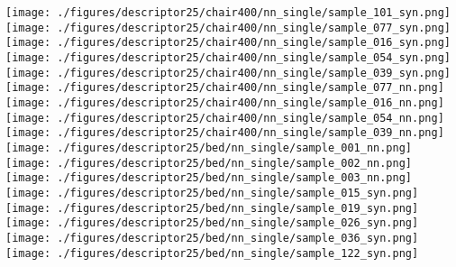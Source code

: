 \documentclass[10pt,twocolumn,letterpaper]{article}
\begin{document}
\begin{figure*}[h]
    \texttt{[image: ./figures/descriptor25/chair400/nn\_single/sample\_101\_syn.png]} \hspace{-3mm}	
    \texttt{[image: ./figures/descriptor25/chair400/nn\_single/sample\_077\_syn.png]} \hspace{-3mm}	
    \texttt{[image: ./figures/descriptor25/chair400/nn\_single/sample\_016\_syn.png]} \hspace{-3mm}	
    \texttt{[image: ./figures/descriptor25/chair400/nn\_single/sample\_054\_syn.png]} \hspace{-2mm}	
     \texttt{[image: ./figures/descriptor25/chair400/nn\_single/sample\_039\_syn.png]}  \hspace{-2mm}   
     \texttt{[image: ./figures/descriptor25/chair400/nn\_single/sample\_077\_nn.png]} \hspace{-3mm}
     \texttt{[image: ./figures/descriptor25/chair400/nn\_single/sample\_016\_nn.png]}
      \hspace{-3mm}
     \texttt{[image: ./figures/descriptor25/chair400/nn\_single/sample\_054\_nn.png]} \hspace{-3mm}
     \texttt{[image: ./figures/descriptor25/chair400/nn\_single/sample\_039\_nn.png]}     
      \\ 
	\texttt{[image: ./figures/descriptor25/bed/nn\_single/sample\_001\_nn.png]} \hspace{-1mm}
	\texttt{[image: ./figures/descriptor25/bed/nn\_single/sample\_002\_nn.png]} \hspace{-1mm}
	\texttt{[image: ./figures/descriptor25/bed/nn\_single/sample\_003\_nn.png]}  
	\texttt{[image: ./figures/descriptor25/bed/nn\_single/sample\_015\_syn.png]}  \hspace{-1mm}
	\texttt{[image: ./figures/descriptor25/bed/nn\_single/sample\_019\_syn.png]}  \hspace{-1mm}
    \texttt{[image: ./figures/descriptor25/bed/nn\_single/sample\_026\_syn.png]}  \hspace{-1mm}
    \texttt{[image: ./figures/descriptor25/bed/nn\_single/sample\_036\_syn.png]}  \hspace{-1mm}
    \texttt{[image: ./figures/descriptor25/bed/nn\_single/sample\_122\_syn.png]} \hspace{-1mm}

\end{figure*}
\end{document}
